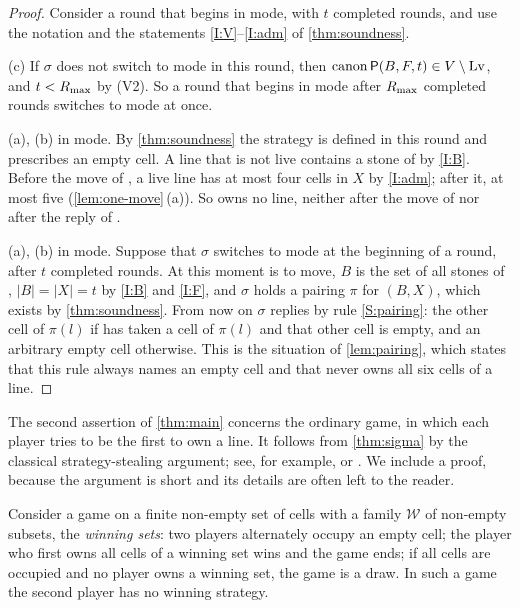 \begin{proof}
Consider a round that begins in \TABLE{} mode, with $t$ completed rounds, and use the notation and the
statements \ref{I:V}--\ref{I:adm} of \cref{thm:soundness}.

(c) If $\sigma$ does not switch to \PAIRING{} mode in this round, then $\operatorname{canon}\mathsf{P}(B,F,t)\in V\setminus\mathrm{Lv}$,
and $t<R_{\max}$ by (V2). So a round that begins in \TABLE{} mode after $R_{\max}$ completed rounds switches to
\PAIRING{} mode at once.

(a), (b) in \TABLE{} mode. By \cref{thm:soundness} the strategy is defined in this round and
prescribes an empty cell. A line that is not live contains a stone of \Breaker{} by \ref{I:B}. Before the
move of \Maker, a live line has at most four cells in $X$ by \ref{I:adm}; after it, at most five
(\cref{lem:one-move}\,(a)). So \Maker{} owns no line, neither after the move of \Maker{} nor after the
reply of \Breaker.

(a), (b) in \PAIRING{} mode. Suppose that $\sigma$ switches to \PAIRING{} mode at the beginning of a round,
after $t$ completed rounds. At this moment \Maker{} is to move, $B$ is the set of all stones of \Breaker,
$|B|=|X|=t$ by \ref{I:B} and \ref{I:F}, and $\sigma$ holds a pairing $\pi$ for $(B,X)$, which exists by
\cref{thm:soundness}. From now on $\sigma$ replies by rule \ref{S:pairing}: the other cell of
$\pi(l)$ if \Maker{} has taken a cell of $\pi(l)$ and that other cell is empty, and an arbitrary empty
cell otherwise. This is the situation of \cref{lem:pairing}, which states that this rule always names
an empty cell and that \Maker{} never owns all six cells of a line.
\end{proof}

The second assertion of \cref{thm:main} concerns the ordinary game, in which each player tries to be
the first to own a line. It follows from \cref{thm:sigma} by the classical strategy-stealing argument; see, for
example, \cite{Beck2008} or \cite[Theorem~3.1]{Krivelevich2014}. We include a proof, because the argument is
short and its details are often left to the reader.

\begin{proposition}\label{prop:stealing}
Consider a game on a finite non-empty set of cells with a family $\mathcal{W}$ of non-empty subsets, the
\emph{winning sets}: two
players alternately occupy an empty cell; the player who first owns all cells of a winning set wins and the
game ends; if all cells are occupied and no player owns a winning set, the game is a draw. In such a game the
second player has no winning strategy.
\end{proposition}

